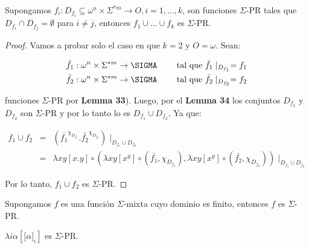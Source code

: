 
  \begin{lemma}
    \PN Supongamos $f_{i}: D_{f_{i}} \subseteq \omega^{n} \times \Sigma^{\ast m} \rightarrow O, i = 1, \dotsc, k$, son
    funciones $\Sigma$-PR tales que $D_{f_{i}} \cap D_{f_{j}} = \emptyset$ para $i \neq j$, entonces $f_{1} \cup \dotsc
    \cup f_{k}$ es $\Sigma$-PR.
  \end{lemma}
  \begin{proof}
    \PN Vamos a probar solo el caso en que $k = 2$ y $O = \omega$. Sean:

    \begin{eqnarray}
      \nonumber \bar{f}_{1}: \omega^{n} \times \Sigma^{\ast m} \rightarrow \SIGMA \qquad \text{ tal que } \bar{f}_{1}
        \mid_{D_{f_{1}}} = f_{1} \\
      \nonumber \bar{f}_{2}: \omega^{n} \times \Sigma^{\ast m} \rightarrow \SIGMA \qquad \text{ tal que } \bar{f}_{2}
        \mid_{D_{f_{2}}} = f_{2}
    \end{eqnarray}

    \PN funciones $\Sigma$-PR por \textbf{Lemma 33}). Luego, por el \textbf{Lemma 34} los conjuntos $D_{f_{1}}$ y
    $D_{f_{2}}$ son $\Sigma$-PR y por lo tanto lo es $ D_{f_{1}} \cup D_{f_{2}}$. Ya que:

    \begin{eqnarray}
      \nonumber f_{1} \cup f_{2} &=& \left(\bar{f_{1}}^{\chi_{D_{f_{1}}}} . \bar{f_{2}}^{\chi_{D_{f_{2}}}}\right)
        \mid_{D_{f_{1}} \cup D_{f_{2}}} \\
      \nonumber &=& \lambda xy \left[x.y\right] \circ \left(\lambda xy \left[x^{y}\right] \circ (\bar{f_{1}},
        \chi_{D_{f_{1}}}), \lambda xy \left[x^{y}\right] \circ (\bar{f_{2}}, \chi_{D_{f_{2}}}) \right) \mid_{D_{f_{1}}
        \cup D_{f_{2}}}
    \end{eqnarray}

    \PN Por lo tanto, $f_{1} \cup f_{2}$ es $\Sigma$-PR.
  \end{proof}

  \begin{corollary}
    \PN Supongamos $f$ es una función $\Sigma$-mixta cuyo dominio es finito, entonces $f$ es $\Sigma$-PR.
  \end{corollary}

  \begin{lemma}
    \PN $\lambda i\alpha \left[\lbrack \alpha]_{i}\right]$ es $\Sigma$-PR.
  \end{lemma}

